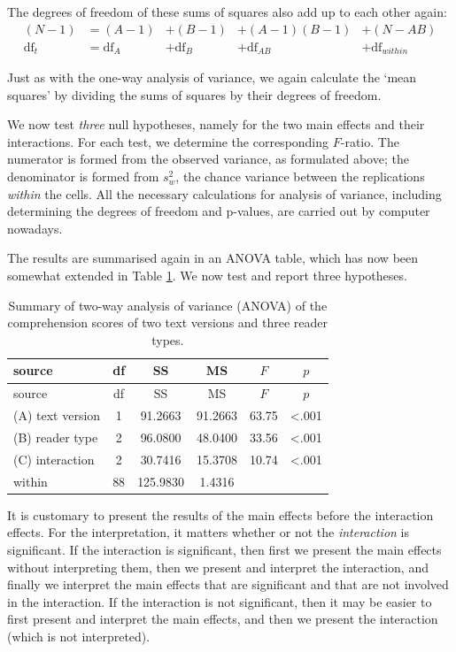 \documentclass[
]{book}
\begin{document}
The degrees of freedom of these sums of squares also add up to each other
again:
\begin{align}
  \label{eq:dftotal2}
    { (N-1) } &= (A-1) &+ (B-1) &+ (A-1)(B-1) &+ (N-AB) \\
    \textrm{df}_t &= \textrm{df}_A &+ \textrm{df}_B &+ \textrm{df}_{AB} &+ \textrm{df}_{within}
\end{align}

Just as with the one-way analysis of variance, we again calculate the
`mean squares' by dividing the sums of squares by their degrees of freedom.

We now test \emph{three} null hypotheses, namely for the two main effects and their
interactions. For each test, we determine the corresponding
\(F\)-ratio. The numerator is formed from the observed variance,
as formulated above; the denominator is formed from \(s^2_w\), the
chance variance between the replications \emph{within} the cells. All
the necessary calculations for analysis of variance, including determining
the degrees of freedom and p-values, are carried out by computer
nowadays.

The results are summarised again in an ANOVA table, which has now been somewhat
extended in Table \ref{tab:DBE12anova}. We now test and report three hypotheses.

\begin{longtable}[]{@{}lccccc@{}}
\caption{\label{tab:DBE12anova} Summary of two-way analysis of variance (ANOVA) of the comprehension scores of two text versions and three reader types.}\tabularnewline
\toprule
source & df & SS & MS & \(F\) & \(p\) \\
\midrule
\endfirsthead
\toprule
source & df & SS & MS & \(F\) & \(p\) \\
\midrule
\endhead
(A) text version & 1 & 91.2663 & 91.2663 & 63.75 & \textless.001 \\
(B) reader type & 2 & 96.0800 & 48.0400 & 33.56 & \textless.001 \\
(C) interaction & 2 & 30.7416 & 15.3708 & 10.74 & \textless.001 \\
within & 88 & 125.9830 & 1.4316 & & \\
\bottomrule
\end{longtable}

It is customary to present the results of the main effects before the interaction effects.
For the interpretation, it matters whether or not the \emph{interaction} is significant.
If the interaction is significant, then first we present the main effects without interpreting them, then we present and interpret the interaction, and finally we interpret the main effects that are significant and that are not involved in the interaction.
If the interaction is not significant, then it may be easier to first present and interpret the main effects, and then we present the interaction (which is not interpreted).
\end{document}
